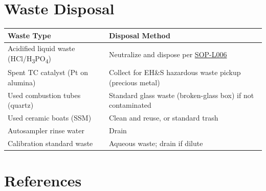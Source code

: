 \documentclass[
  11pt,
  letterpaper,
]{article}
\newcounter{none} %
\begin{document}
\section{Waste Disposal}\label{waste-disposal}

{\def\LTcaptype{none} %
\begin{longtable}[]{@{}
  >{\raggedright\arraybackslash}p{}
  >{\raggedright\arraybackslash}p{}@{}}
\toprule\noalign{}
\begin{minipage}[b]{\linewidth}\raggedright
Waste Type
\end{minipage} & \begin{minipage}[b]{\linewidth}\raggedright
Disposal Method
\end{minipage} \\
\midrule\noalign{}
\endhead
\bottomrule\noalign{}
\endlastfoot
Acidified liquid waste (HCl/H\textsubscript{3}PO\textsubscript{4}) &
Neutralize and dispose per
\href{SOP-L006-waste-disposal.qmd}{SOP-L006} \\
Spent TC catalyst (Pt on alumina) & Collect for EH\&S hazardous waste
pickup (precious metal) \\
Used combustion tubes (quartz) & Standard glass waste (broken-glass box)
if not contaminated \\
Used ceramic boats (SSM) & Clean and reuse, or standard trash \\
Autosampler rinse water & Drain \\
Calibration standard waste & Aqueous waste; drain if dilute \\
\end{longtable}
}

\section{References}\label{references}
\end{document}
